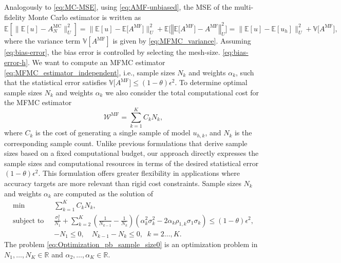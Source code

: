 Analogously to \eqref{eq:MC-MSE}, using \eqref{eq:AMF-unbiased},
the MSE of the multi-fidelity Monte Carlo estimator is written as 
%
\[
\mathbb E\left[ \big\| \mathbb{E}[u]-A^{\text{MC}}_{N}  \big\| _{U}^2\right]
= \Big\| \mathbb{E}[u]-\mathbb{E}\big[A^{\text{MF}}\big] \Big\|_{U}^2
    +\mathbb E\Big[ \left\Vert\mathbb{E}\big[A^{\text{MF}}\big]-A^{\text{MF}} \right\Vert_{U}^2 \Big]
=\big\| \mathbb{E}[u]-\mathbb{E}[u_h] \big\|_{U}^2
    + \mathbb{V}\big[A^{\text{MF}}\big],
\]
%
where the variance term $\mathbb{V}[A^{\text{MF}}]$ is given by \eqref{eq:MFMC_variance}. 
Assuming \eqref{eq:bias-error}, the bias error is controlled by selecting the mesh-size. \eqref{eq:bias-error-h}.
We want to compute an MFMC estimator \eqref{eq:MFMC_estimator_independent}, i.e., 
sample sizes $N_k$ and weights $\alpha_k$, such that the statistical error 
satisfies $\mathbb{V}\big[A^{\text{MF}}\big] \le (1-\theta)\epsilon^2$.
To determine  optimal sample sizes $N_k$ and weights $\alpha_k$ we also
consider the total computational cost for the MFMC estimator
\[
        \mathcal{W}^{\text{MF}} = \sum_{k=1}^K C_kN_k,
\]
where $C_k$ is the cost of generating a single sample of model $u_{h,k}$, and $N_k$ is the corresponding sample count. Unlike previous formulations \cite{PeWiGu:2016} that derive sample sizes based on a fixed computational budget, our approach directly expresses the sample sizes and computational resources in terms of the desired statistical error
$ (1-\theta)\epsilon^2$. This formulation offers greater flexibility in applications where accuracy targets are more relevant than rigid cost constraints. 
Sample sizes $N_k$ and weights $\alpha_k$ are computed as the solution of
\begin{subequations}\label{eq:Optimization_pb_sample_size0}
    \begin{align}
    \min  \; &\sum\limits_{k=1}^K C_kN_k,\\
    \label{eq:Optimization_pb_sample_size0_var}
       \text{subject to } \; & \frac{\sigma_1^2}{N_1} + \sum_{k=2}^K \left(\frac{1}{N_{k-1}} - \frac{1}{N_k}\right)\left(\alpha_k^2\sigma_k^2 - 2\alpha_k\rho_{1,k}\sigma_1\sigma_k\right) \le  (1-\theta)\epsilon^2,\\[2pt]
       &\displaystyle -N_1\le 0,\quad \displaystyle N_{k-1}-N_k\le 0, \;\; k=2\ldots,K.
    \end{align}
\end{subequations}
The problem \eqref{eq:Optimization_pb_sample_size0} is an optimization problem in 
$N_1,\ldots, N_K\in \mathbb{R}$ and $\alpha_2,\ldots,\alpha_K\in \mathbb{R}$.

